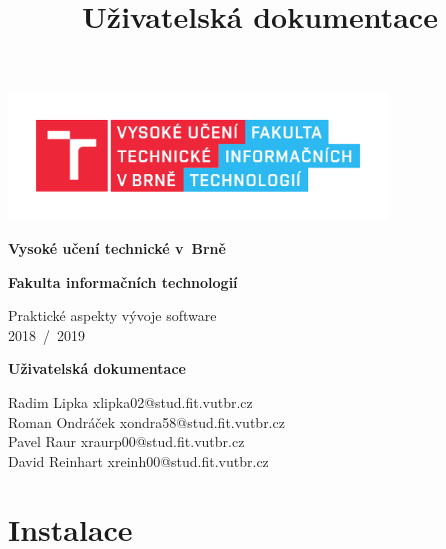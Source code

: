 \documentclass[11pt,a4paper,titlepage]{article}
\title{Uživatelská dokumentace}
\begin{document}
	\begin{titlepage}
		\begin{center}
			\includegraphics[height = 96pt]{img/FIT_barevne_CMYK_CZ.pdf} \\

			\begin{LARGE}
				\textbf{Vysoké učení technické v~Brně} \\
			\end{LARGE}

			\begin{Large}
				\textbf{Fakulta informačních technologií} \\
			\end{Large}

			\begin{large}
				Praktické aspekty vývoje software \\
				2018~/~2019
			\end{large}


			\begin{huge}
				\textbf{Uživatelská dokumentace} \\
			\end{huge}


			\begin{large}
				Radim Lipka xlipka02@stud.fit.vutbr.cz \\
				Roman Ondráček xondra58@stud.fit.vutbr.cz \\
				Pavel Raur xraurp00@stud.fit.vutbr.cz \\
				David Reinhart xreinh00@stud.fit.vutbr.cz \\
			\end{large}
		\end{center}
	\end{titlepage}


	\tableofcontents
	\newpage

	\section{Instalace}
\end{document}
